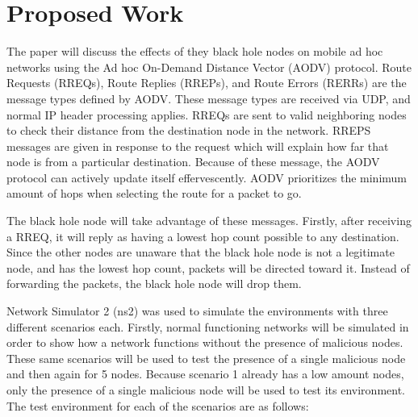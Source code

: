 \documentclass[conference,12pt]{IEEEtran}
\begin{document}
\section{Proposed Work}
The paper will discuss the effects of they black hole nodes on mobile ad hoc networks using the Ad hoc On-Demand Distance Vector (AODV) protocol. Route Requests (RREQs), Route Replies (RREPs), and Route Errors (RERRs) are the message types defined by AODV. These message types are received via UDP, and normal IP header processing applies\cite{Perkins}. RREQs are sent to valid neighboring nodes to check their distance from the destination node in the network. RREPS messages are given in response to the request which will explain how far that node is from a particular destination. Because of these message, the AODV protocol can actively update itself effervescently. AODV prioritizes the minimum amount of hops when selecting the route for a packet to go. 

The black hole node will take advantage of these messages. Firstly, after receiving a RREQ, it will reply as having a lowest hop count possible to any destination. Since the other nodes are unaware that the black hole node is not a legitimate node, and has the lowest hop count, packets will be directed toward it. Instead of forwarding the packets, the black hole node will drop them. 

Network Simulator 2 (ns2) was used to simulate the environments with three different scenarios each. Firstly, normal functioning networks will be simulated in order to show how a network functions without the presence of malicious nodes. These same scenarios will be used to test the presence of a single malicious node and then again for 5 nodes. Because scenario 1 already has a low amount nodes, only the presence of a single malicious node will be used to test its environment.
The test environment for each of the scenarios are as follows:
\end{document}
